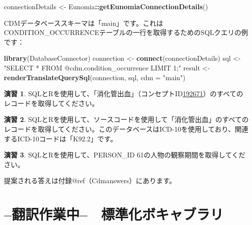 \documentclass[
  11pt]{book}
\newenvironment{Shaded}{\begin{snugshade}}{\end{snugshade}}
\newcommand{\AttributeTok}[1]{\textcolor[rgb]{0.13,0.29,0.53}{#1}}
\newcommand{\FunctionTok}[1]{\textcolor[rgb]{0.13,0.29,0.53}{\textbf{#1}}}
\newcommand{\NormalTok}[1]{#1}
\newcommand{\OtherTok}[1]{\textcolor[rgb]{0.56,0.35,0.01}{#1}}
\newcommand{\SpecialCharTok}[1]{\textcolor[rgb]{0.81,0.36,0.00}{\textbf{#1}}}
\newcommand{\StringTok}[1]{\textcolor[rgb]{0.31,0.60,0.02}{#1}}
\theoremstyle{definition}
\theoremstyle{definition}
\theoremstyle{definition}
\newtheorem{exercise}{演習}[chapter]
\theoremstyle{definition}
\theoremstyle{remark}
\begin{document}
\begin{Shaded}
\begin{Highlighting}[]
\NormalTok{connectionDetails }\OtherTok{\textless{}{-}}\NormalTok{ Eunomia}\SpecialCharTok{::}\FunctionTok{getEunomiaConnectionDetails}\NormalTok{()}
\end{Highlighting}
\end{Shaded}

CDMデータベーススキーマは「main」です。これはCONDITION\_OCCURRENCEテーブルの一行を取得するためのSQLクエリの例です：

\begin{Shaded}
\begin{Highlighting}[]
\FunctionTok{library}\NormalTok{(DatabaseConnector)}
\NormalTok{connection }\OtherTok{\textless{}{-}} \FunctionTok{connect}\NormalTok{(connectionDetails)}
\NormalTok{sql }\OtherTok{\textless{}{-}} \StringTok{"SELECT *}
\StringTok{FROM @cdm.condition\_occurrence}
\StringTok{LIMIT 1;"}
\NormalTok{result }\OtherTok{\textless{}{-}} \FunctionTok{renderTranslateQuerySql}\NormalTok{(connection, sql, }\AttributeTok{cdm =} \StringTok{"main"}\NormalTok{)}
\end{Highlighting}
\end{Shaded}

\begin{exercise}
\protect\hypertarget{exr:exerciseGiBleedRecords}{}\label{exr:exerciseGiBleedRecords}SQLとRを使用して、「消化管出血」（コンセプトID\href{http://athena.ohdsi.org/search-terms/terms/192671}{192671}）のすべてのレコードを取得してください。
\end{exercise}

\begin{exercise}
\protect\hypertarget{exr:exercisePersonSource}{}\label{exr:exercisePersonSource}SQLとRを使用して、ソースコードを使用して「消化管出血」のすべてのレコードを取得してください。このデータベースはICD-10を使用しており、関連するICD-10コードは「K92.2」です。
\end{exercise}

\begin{exercise}
\protect\hypertarget{exr:exercisePerson61Records}{}\label{exr:exercisePerson61Records}SQLとRを使用して、PERSON\_ID 61の人物の観察期間を取得してください。
\end{exercise}

提案される答えは付録@ref（Cdmanswers）にあります。

\chapter{--翻訳作業中--　標準化ボキャブラリ}\label{StandardizedVocabularies}
\end{document}
